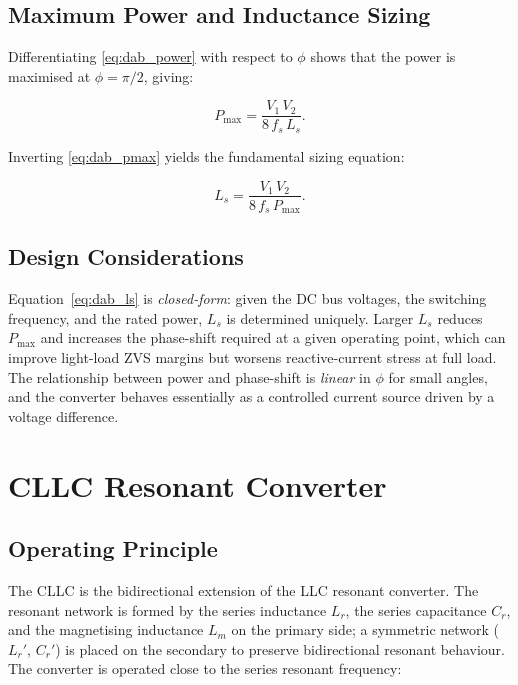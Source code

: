 \documentclass[a4paper, 11pt]{article}
\begin{document}
	\subsection{Maximum Power and Inductance Sizing}
	
	Differentiating \eqref{eq:dab_power} with respect to $\phi$ shows that
	the power is maximised at $\phi = \pi/2$, giving:
	
	\begin{equation}
		P_{\max} = \frac{V_1 \, V_2}{8\, f_s\, L_s}.
		\label{eq:dab_pmax}
	\end{equation}
	
	Inverting \eqref{eq:dab_pmax} yields the fundamental sizing equation:
	
	\begin{equation}
		\boxed{L_s = \frac{V_1 \, V_2}{8\, f_s\, P_{\max}}.}
		\label{eq:dab_ls}
	\end{equation}
	
	\subsection{Design Considerations}
	
	Equation~\eqref{eq:dab_ls} is \emph{closed-form}: given the DC bus
	voltages, the switching frequency, and the rated power, $L_s$ is
	determined uniquely.  Larger $L_s$ reduces $P_{\max}$ and increases
	the phase-shift required at a given operating point, which can
	improve light-load ZVS margins but worsens reactive-current stress at
	full load.  The relationship between power and phase-shift is
	\emph{linear} in $\phi$ for small angles, and the converter behaves
	essentially as a controlled current source driven by a voltage
	difference.
	
	\section{CLLC Resonant Converter}
	
	\subsection{Operating Principle}
	
	The CLLC is the bidirectional extension of the LLC resonant converter.
	The resonant network is formed by the series inductance $L_r$,
	the series capacitance $C_r$, and the magnetising inductance $L_m$ on
	the primary side; a symmetric network ($L_r'$, $C_r'$) is placed on
	the secondary to preserve bidirectional resonant behaviour.
	The converter is operated close to the series resonant frequency:
	
\end{document}
